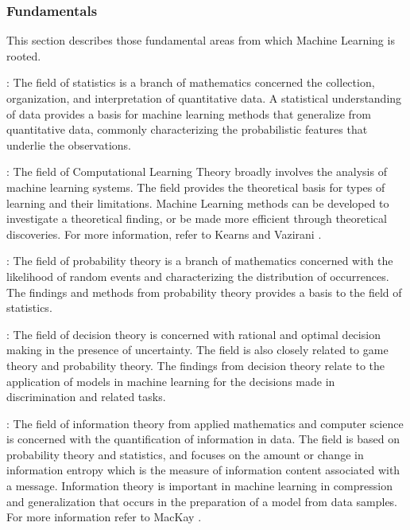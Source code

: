 \subsubsection{Fundamentals}
This section describes those fundamental areas from which Machine Learning is rooted. 

\begin{description}
	\item[Statistics]: The field of statistics is a branch of mathematics concerned the collection, organization, and interpretation of quantitative data. A statistical understanding of data provides a basis for machine learning methods that generalize from quantitative data, commonly characterizing the probabilistic features that underlie the observations.
	
	\item[Computational Learning Theory]: The field of Computational Learning Theory broadly involves the analysis of machine learning systems. The field provides the theoretical basis for types of learning and their limitations. Machine Learning methods can be developed to investigate a theoretical finding, or be made more efficient through theoretical discoveries. For more information, refer to Kearns and Vazirani \cite{Kearns1994}.
	
	\item[Probability Theory]: The field of probability theory is a branch of mathematics concerned with the likelihood of random events and characterizing the distribution of occurrences. The findings and methods from probability theory provides a basis to the field of statistics. 
	
	\item[Decision Theory]: The field of decision theory is concerned with rational and optimal decision making in the presence of uncertainty. The field is also closely related to game theory and probability theory. The findings from decision theory relate to the application of models in machine learning for the decisions made in discrimination and related tasks.
	
	\item[Information Theory]: The field of information theory from applied mathematics and computer science is concerned with the quantification of information in data. The field is based on probability theory and statistics, and focuses on the amount or change in information entropy which is the measure of information content associated with a message. Information theory is important in machine learning in compression and generalization that occurs in the preparation of a model from data samples. For more information refer to MacKay \cite{MacKay2003}.
\end{description}

